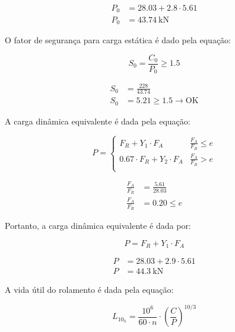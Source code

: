 \begin{align*}
  P_0 & = \num{28.03} + \num{2.8} \cdot \num{5.61} \\
  P_0 & = \boxed{\SI{43.74}{\kilo\newton}}
\end{align*}

O fator de segurança para carga estática é dado pela equação:

\begin{equation}
  S_0 = \frac{C_0}{P_0} \geq \num{1.5}
  \label{eq:fator_seguranca_estatica}
\end{equation}

\begin{align*}
  S_0 & = \frac{\num{228}}{\num{43.74}}                           \\
  S_0 & = \boxed{\num{5.21}} \geq \num{1.5} \rightarrow \text{OK}
\end{align*}

A carga dinâmica equivalente é dada pela equação:

\[
  P =
  \begin{cases}
    F_R + Y_1 \cdot F_A                  & \frac{F_A}{F_R} \leq e \\
    \num{0.67} \cdot F_R + Y_2 \cdot F_A & \frac{F_A}{F_R} > e    \\
  \end{cases}
\]

\begin{align*}
  \frac{F_A}{F_R} & = \frac{\num{5.61}}{\num{28.03}} \\
  \frac{F_A}{F_R} & = \num{0.20} \leq e
\end{align*}

Portanto, a carga dinâmica equivalente é dada por:

\begin{equation}
  P = F_R + Y_1 \cdot F_A
  \label{eq:carga_dinamica_equivalente}
\end{equation}

\begin{align*}
  P & = \num{28.03} + \num{2.9} \cdot \num{5.61} \\
  P & = \boxed{\SI{44.3}{\kilo\newton}}
\end{align*}

A vida útil do rolamento é dada pela equação:

\begin{equation}
  L_{10_h} = \frac{10^6}{60 \cdot n} \cdot \left( \frac{C}{P} \right)^{10/3}
  \label{eq:vida_util_rolamento}
\end{equation}

